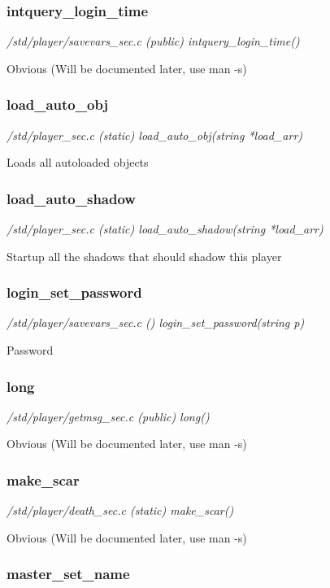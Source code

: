 \subsubsection{intquery\_login\_time}

{\em /std/player/savevars\_sec.c (public) intquery\_login\_time()}

Obvious (Will be documented later, use man -s)


\subsubsection{load\_auto\_obj}

{\em /std/player\_sec.c (static) load\_auto\_obj(string *load\_arr)}

Loads all autoloaded objects


\subsubsection{load\_auto\_shadow}

{\em /std/player\_sec.c (static) load\_auto\_shadow(string *load\_arr)}

Startup all the shadows that should shadow this player


\subsubsection{login\_set\_password}

{\em /std/player/savevars\_sec.c () login\_set\_password(string p)}

Password


\subsubsection{long}

{\em /std/player/getmsg\_sec.c (public) long()}

Obvious (Will be documented later, use man -s)


\subsubsection{make\_scar}

{\em /std/player/death\_sec.c (static) make\_scar()}

Obvious (Will be documented later, use man -s)


\subsubsection{master\_set\_name}


